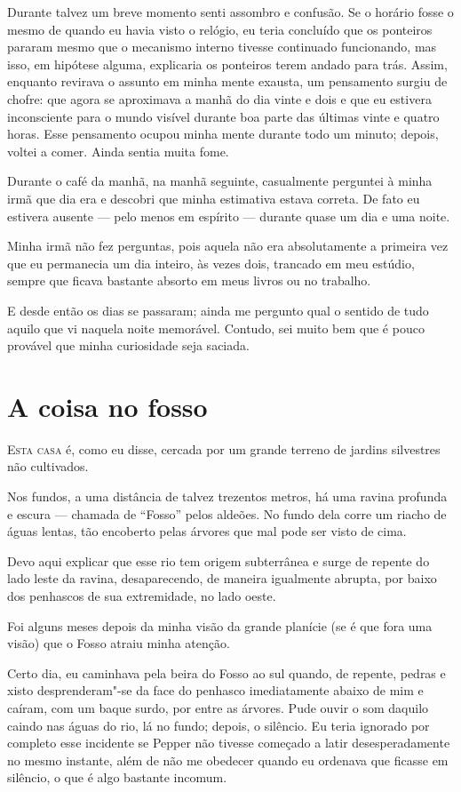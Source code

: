 Durante talvez um breve momento senti assombro e confusão. Se o horário fosse o mesmo de quando eu havia visto o
relógio, eu teria concluído que os ponteiros pararam mesmo que o mecanismo interno tivesse continuado funcionando, mas
isso, em hipótese alguma, explicaria os ponteiros terem andado para trás. Assim, enquanto revirava o assunto em minha
mente exausta, um pensamento surgiu de chofre: que agora se aproximava a manhã do dia vinte e dois e que eu estivera
inconsciente para o mundo visível durante boa parte das últimas vinte e quatro horas. Esse pensamento ocupou minha
mente durante todo um minuto; depois, voltei a comer. Ainda sentia muita fome.

Durante o café da manhã, na manhã seguinte, casualmente perguntei à minha irmã que dia era e descobri que
minha estimativa estava correta. De fato eu estivera ausente --- pelo menos em espírito --- durante quase um dia e uma
noite.

Minha irmã não fez perguntas, pois aquela não era absolutamente a primeira vez que eu permanecia um dia inteiro, às vezes
dois, trancado em meu estúdio, sempre que ficava bastante absorto em meus livros ou no trabalho.

E desde então os dias se passaram; ainda me pergunto qual o sentido de tudo aquilo que vi naquela noite memorável.
Contudo, sei muito bem que é pouco provável que minha curiosidade seja saciada.


\clearpage

\chapter{A coisa no fosso}

\textsc{Esta casa} é, como eu disse, cercada por um grande terreno de jardins silvestres não cultivados.

Nos fundos, a uma distância de talvez trezentos metros, há uma ravina profunda e escura --- chamada de
``Fosso'' pelos aldeões. No fundo dela corre um riacho de águas lentas, tão encoberto pelas
árvores que mal pode ser visto de cima.

Devo aqui explicar que esse rio tem origem subterrânea e surge de repente do lado leste da ravina, desaparecendo, de
maneira igualmente abrupta, por baixo dos penhascos de sua extremidade, no lado oeste.

Foi alguns meses depois da minha visão da grande planície (se é que fora uma visão) que o Fosso atraiu minha atenção.

Certo dia, eu caminhava pela beira do Fosso ao sul quando, de repente, pedras e xisto desprenderam"-se da face do
penhasco imediatamente abaixo de mim e caíram, com um baque surdo, por entre as árvores. Pude ouvir o som daquilo
caindo nas águas do rio, lá no fundo; depois, o silêncio. Eu teria ignorado por completo esse incidente se Pepper não
tivesse começado a latir desesperadamente no mesmo instante, além de não me obedecer quando eu ordenava que ficasse em
silêncio, o que é algo bastante incomum.

